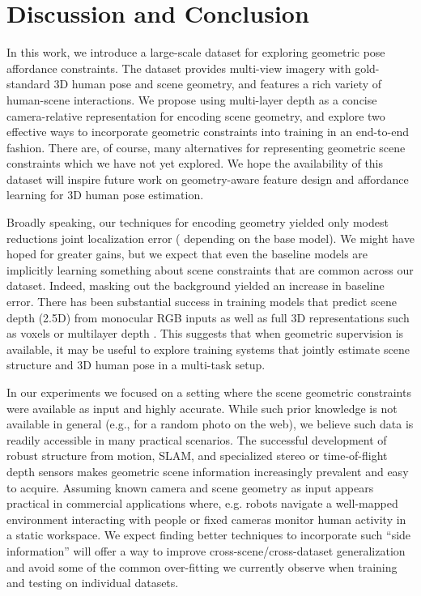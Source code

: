 \documentclass[times,referee,twocolumn,final,authoryear]{elsarticle}
\begin{document}
\section{Discussion and Conclusion}
 In this work, we introduce a large-scale dataset for exploring geometric 
pose affordance constraints. The dataset provides multi-view imagery with 
gold-standard 3D human pose and scene geometry, and features a rich variety 
of human-scene interactions. We propose using multi-layer depth
as a concise camera-relative representation for encoding scene geometry, and 
explore two effective ways to incorporate geometric constraints into training 
in an end-to-end fashion. There are, of course, many alternatives for representing 
geometric scene constraints which we have not yet explored. We
hope the availability of this dataset will inspire future work on
geometry-aware feature design and affordance learning for 3D human pose
estimation.


Broadly speaking, our techniques for encoding geometry yielded only modest reductions 
joint localization error ( depending on the base model).  We might have 
hoped for greater gains, but we expect that even the baseline models are implicitly 
learning something about scene constraints that are common across our dataset. 
Indeed, masking out the background yielded an  increase in baseline error.
There has been substantial success in training models that predict scene depth (2.5D) 
from monocular RGB inputs \citep{eigen,singleimagedepth} as well as full 3D representations such as
voxels \citep{ssn,shubhamfactrshapepose} or multilayer depth \citep{mdp}. This 
suggests that when geometric supervision is available, it may be useful to explore 
training systems that jointly estimate scene structure and 3D human pose in a 
multi-task setup.



In our experiments we focused on a setting where the scene geometric constraints were
available as input and highly accurate. While such prior knowledge is not available
in general (e.g., for a random photo on the web), we believe such data is readily 
accessible in many practical scenarios. The successful development of robust structure
from motion, SLAM, and specialized stereo or time-of-flight depth sensors makes geometric
scene information increasingly prevalent and easy to acquire. Assuming known camera and 
scene geometry as input appears practical in commercial applications where, e.g. robots 
navigate a well-mapped environment interacting with people or fixed cameras monitor 
human activity in a static workspace. We expect finding better techniques to incorporate 
such ``side information'' will offer a way to improve cross-scene/cross-dataset generalization 
and avoid some of the common over-fitting we currently observe when training and testing 
on individual datasets.
\end{document}
